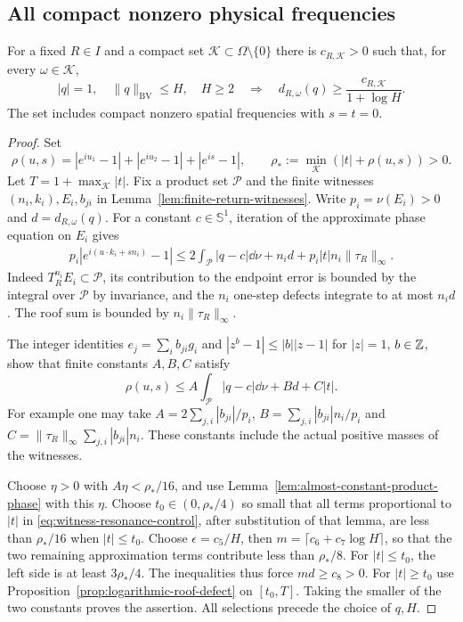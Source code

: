 \subsection{All compact nonzero physical frequencies}
\begin{theorem}
\label{thm:compact-log-phase-defect}
For a fixed $R\in I$ and a compact set
$\mathcal K\subset\Omega\setminus\{0\}$ there is $c_{R,\mathcal K}>0$
such that, for every $\omega\in\mathcal K$,
\begin{equation}\label{eq:compact-log-phase-defect}
 |q|=1,\quad \|q\|_{\mathrm{BV}}\le H,\quad H\ge2
 \quad\Longrightarrow\quad
 d_{R,\omega}(q)\ge\frac{c_{R,\mathcal K}}{1+\log H}.
\end{equation}
The set includes compact nonzero spatial frequencies with $s=t=0$.
\end{theorem}
\begin{proof}
Set
\[
 \rho(u,s)=|e^{iu_1}-1|+|e^{iu_2}-1|+|e^{is}-1|,
 \qquad \rho_*:=\min_{\mathcal K}(|t|+\rho(u,s))>0.
\]
Let $T=1+\max_{\mathcal K}|t|$. Fix a product set $\mathcal P$ and
the finite witnesses $(n_i,k_i),E_i,b_{ji}$ in
Lemma~\ref{lem:finite-return-witnesses}. Write $p_i=\nu(E_i)>0$ and
$d=d_{R,\omega}(q)$. For a constant $c\in\mathbb S^1$, iteration
of the approximate phase equation on $E_i$ gives
\begin{align}\label{eq:witness-phase-defect}
 p_i|e^{i(u\cdot k_i+s n_i)}-1|
 \le 2\int_{\mathcal P}|q-c|\dd\nu+n_i d
                     +p_i|t|n_i\|\tau_R\|_\infty.
\end{align}
Indeed $T_R^{n_i}E_i\subset\mathcal P$, its contribution to the
endpoint error is bounded by the integral over $\mathcal P$ by
invariance, and the $n_i$ one-step defects integrate to at most $n_i d$.
The roof sum is bounded by $n_i\|\tau_R\|_\infty$.

The integer identities $e_j=\sum_i b_{ji}g_i$ and
$|z^b-1|\le |b||z-1|$ for $|z|=1$, $b\in\mathbb Z$, show that finite
constants $A,B,C$ satisfy
\begin{equation}\label{eq:witness-resonance-control}
 \rho(u,s)\le A\int_{\mathcal P}|q-c|\dd\nu+B d+C|t|.
\end{equation}
For example one may take
$A=2\sum_{j,i}|b_{ji}|/p_i$,
$B=\sum_{j,i}|b_{ji}|n_i/p_i$ and
$C=\|\tau_R\|_\infty\sum_{j,i}|b_{ji}|n_i$.
These constants include the actual positive masses of the witnesses.

Choose $\eta>0$ with $A\eta<\rho_*/16$, and use
Lemma~\ref{lem:almost-constant-product-phase} with this $\eta$.
Choose $t_0\in(0,\rho_*/4)$ so small that all terms proportional
to $|t|$ in \eqref{eq:witness-resonance-control}, after substitution
of that lemma, are less than $\rho_*/16$ when $|t|\le t_0$.
Choose $\epsilon=c_5/H$, then $m=\lceil c_6+c_7\log H\rceil$,
so that the two remaining approximation terms contribute less than
$\rho_*/8$. For $|t|\le t_0$, the left side is at least
$3\rho_*/4$. The inequalities thus force $m d\ge c_8>0$.
For $|t|\ge t_0$ use Proposition~\ref{prop:logarithmic-roof-defect}
on $[t_0,T]$. Taking the smaller of the two constants proves the
assertion. All selections precede the choice of $q,H$.
\end{proof}

